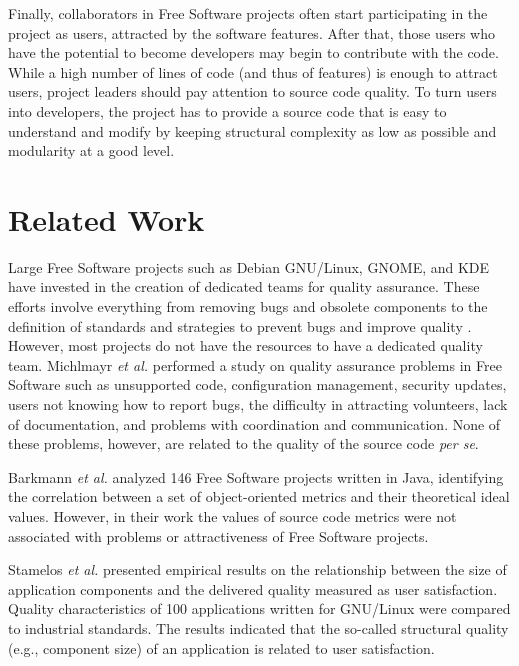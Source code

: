 \documentclass[conference]{IEEEtran}
\begin{document}
Finally, collaborators in Free Software projects often start participating in
the project as users, attracted by the software features.
%
After that, those users who have the potential to become developers may begin
to contribute with the code.
%
While a high number of lines of code (and thus of features) is enough to attract
users, project leaders should pay attention to source code quality.
%
To turn users into developers, the project has to provide a source code that is
easy to understand and modify by keeping structural complexity as low as possible
and modularity at a good level.

\section{Related Work}
\label{related}

Large Free Software projects such as Debian GNU/Linux, GNOME, and KDE have invested in the
creation of dedicated teams for quality assurance. These efforts involve everything
from removing bugs and obsolete components to the definition of standards
and strategies to prevent bugs and improve quality \cite{Michlmayr2005}.
However, most projects do not have the resources to have a dedicated quality
team.
%
Michlmayr \emph{et al.} \cite{Michlmayr2005} performed a study on quality
assurance problems in Free Software such as unsupported code, configuration management,
security updates, users not knowing how to report bugs, the difficulty in
attracting volunteers, lack of documentation, and problems with coordination
and communication. None of these problems, however, are related to the quality
of the source code \emph{per se}.

Barkmann \emph{et al.} \cite{Barkmann2009} analyzed 146 Free Software projects
written in Java, identifying the correlation between a set of object-oriented
metrics and their theoretical ideal values. 
%
However, in their work the values of source code metrics were not associated
with problems or attractiveness of Free Software projects.

Stamelos \emph{et al.} \cite{Stamelos2002} presented empirical results on the relationship
between the size of application components and the delivered quality
measured as user satisfaction.
%
Quality characteristics of 100 applications written for GNU/Linux were compared to
industrial standards. The results indicated that the so-called structural
quality (e.g., component size) of an application is related to user satisfaction.
\end{document}
